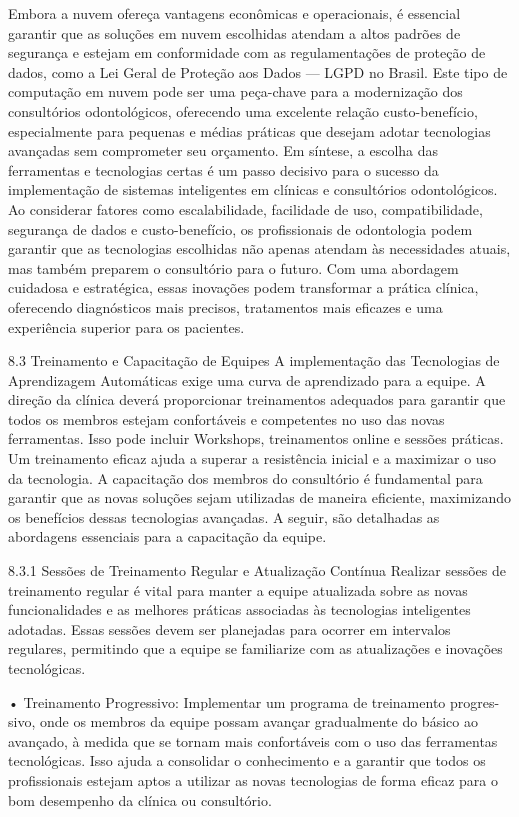          Embora a nuvem ofereça vantagens econômicas e operacionais, é essencial
garantir que as soluções em nuvem escolhidas atendam a altos padrões de segurança
e estejam em conformidade com as regulamentações de proteção de dados, como a
Lei Geral de Proteção aos Dados — LGPD no Brasil. Este tipo de computação em
nuvem pode ser uma peça-chave para a modernização dos consultórios odontológicos,
oferecendo uma excelente relação custo-benefício, especialmente para pequenas e
médias práticas que desejam adotar tecnologias avançadas sem comprometer seu
orçamento.
         Em síntese, a escolha das ferramentas e tecnologias certas é um passo
decisivo para o sucesso da implementação de sistemas inteligentes em clínicas e
consultórios odontológicos. Ao considerar fatores como escalabilidade, facilidade
de uso, compatibilidade, segurança de dados e custo-benefício, os profissionais de
odontologia podem garantir que as tecnologias escolhidas não apenas atendam às
necessidades atuais, mas também preparem o consultório para o futuro. Com uma
abordagem cuidadosa e estratégica, essas inovações podem transformar a prática
clínica, oferecendo diagnósticos mais precisos, tratamentos mais eficazes e uma
experiência superior para os pacientes.


8.3       Treinamento e Capacitação de Equipes
A implementação das Tecnologias de Aprendizagem Automáticas exige uma curva de
aprendizado para a equipe. A direção da clínica deverá proporcionar treinamentos
adequados para garantir que todos os membros estejam confortáveis e competentes no
uso das novas ferramentas. Isso pode incluir Workshops, treinamentos online e sessões
práticas. Um treinamento eficaz ajuda a superar a resistência inicial e a maximizar
o uso da tecnologia. A capacitação dos membros do consultório é fundamental para
garantir que as novas soluções sejam utilizadas de maneira eficiente, maximizando os
benefícios dessas tecnologias avançadas.
          A seguir, são detalhadas as abordagens essenciais para a capacitação da
equipe.

8.3.1     Sessões de Treinamento Regular e Atualização Contínua
Realizar sessões de treinamento regular é vital para manter a equipe atualizada sobre
as novas funcionalidades e as melhores práticas associadas às tecnologias inteligentes
adotadas. Essas sessões devem ser planejadas para ocorrer em intervalos regulares,
permitindo que a equipe se familiarize com as atualizações e inovações tecnológicas.

    • Treinamento Progressivo: Implementar um programa de treinamento progres-
      sivo, onde os membros da equipe possam avançar gradualmente do básico ao
      avançado, à medida que se tornam mais confortáveis com o uso das ferramentas
      tecnológicas. Isso ajuda a consolidar o conhecimento e a garantir que todos os
      profissionais estejam aptos a utilizar as novas tecnologias de forma eficaz para o
      bom desempenho da clínica ou consultório.


